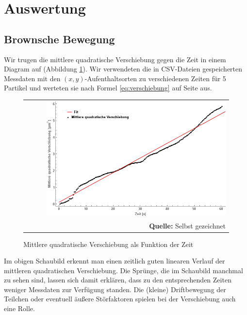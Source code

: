 \documentclass[a4paper,titlepage]{scrartcl}
\numberwithin{equation}{section}
\begin{document}
\section{Auswertung}
\label{subsec:brown}
\subsection{Brownsche Bewegung}
Wir trugen die mittlere quadratische Verschiebung gegen die Zeit in einem Diagram auf (Abbildung \ref{fig:msd}). Wir verwendeten die in CSV-Dateien gespeicherten Messdaten mit den $(x,y)$-Aufenthaltsorten zu verschiedenen Zeiten für 5 Partikel und werteten sie nach Formel \ref{eq:verschiebung} auf Seite \pageref{eq:verschiebung} aus.
\begin{figure}[H]
	\centering
	\begin{tabular}{@{}r@{}}
		\includegraphics[width=0.9\textwidth]{msd.png}\\
		\footnotesize\sffamily\textbf{Quelle:} Selbst gezeichnet
	\end{tabular}
	\caption{Mittlere quadratische Verschiebung als Funktion der Zeit}
    \label{fig:msd}
\end{figure}
Im obigen Schaubild erkennt man einen zeitlich guten linearen Verlauf der mittleren quadratischen Verschiebung. Die Sprünge, die im Schaubild manchmal zu sehen sind, lassen sich damit erklären, dass zu den entsprechenden Zeiten weniger Messdaten zur Verfügung standen. Die (kleine) Driftbewegung der Teilchen oder eventuell äußere Störfaktoren spielen bei der Verschiebung auch eine Rolle.
\end{document}
